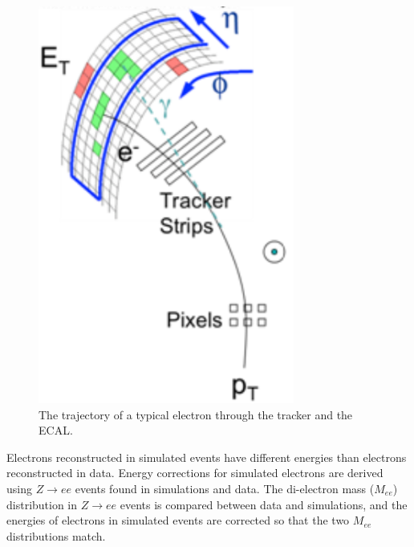 \begin{figure}[h]
	\centering
	\includegraphics[width=0.75\textwidth]{figures/electronTrackAndSupercluster.png}
	\caption{The trajectory of a typical electron through the tracker and the ECAL.}
	\label{fig:eleTrackAndSC}
\end{figure}

Electrons reconstructed in simulated events have different energies than electrons reconstructed in data.  Energy 
corrections for simulated electrons are derived using $Z \rightarrow ee$ events found in simulations and data.  The di-electron mass 
($M_{ee}$) distribution in $Z \rightarrow ee$ events is compared between data and simulations, and the energies of electrons 
in simulated events are corrected so that the two $M_{ee}$ distributions match.

